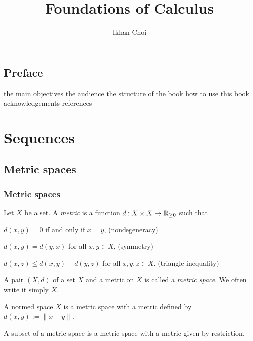 \documentclass{../../large}
\begin{document}
\title{Foundations of Calculus}
\author{Ikhan Choi}
\maketitle



\chapter*{Preface}
the main objectives
the audience
the structure of the book
how to use this book
acknowledgements
references


\tableofcontents


\part{Sequences}


\chapter{Metric spaces}
\section{Metric spaces}
\begin{prb}
Let $X$ be a set.
A \emph{metric} is a function $d:X\times X\to\mathbb{R}_{\ge0}$ such that
\begin{parts}[(i)]
\item $d(x,y)=0$ if and only if $x=y$, \hfill(nondegeneracy)
\item $d(x,y)=d(y,x)$ for all $x,y\in X$, \hfill(symmetry)
\item $d(x,z)\le d(x,y)+d(y,z)$ for all $x,y,z\in X$. \hfill(triangle inequality)
\end{parts}
A pair $(X,d)$ of a set $X$ and a metric on $X$ is called a \emph{metric space}.
We often write it simply $X$.
\begin{parts}
\item
A normed space $X$ is a metric space with a metric defined by $d(x,y):=\|x-y\|$.
\item
A subset of a metric space is a metric space with a metric given by restriction.
\end{parts}
\end{prb}
\end{document}
